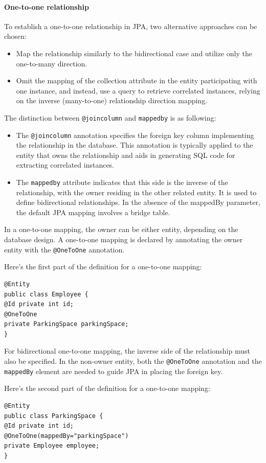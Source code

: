 \paragraph*{One-to-one relationship}
To establish a one-to-one relationship in JPA, two alternative approaches can be chosen:
\begin{itemize}
    \item Map the relationship similarly to the bidirectional case and utilize only the one-to-many direction.
    \item Omit the mapping of the collection attribute in the entity participating with one instance, and instead, use a query to retrieve correlated instances, relying on the inverse (many-to-one) relationship direction mapping.
\end{itemize}
The distinction between \texttt{@joincolumn} and \texttt{mappedby} is as following: 
\begin{itemize}
    \item The \texttt{@joincolumn} annotation specifies the foreign key column implementing the relationship in the database. 
        This annotation is typically applied to the entity that owns the relationship and aids in generating SQL code for extracting correlated instances.
    \item The \texttt{mappedby} attribute indicates that this side is the inverse of the relationship, with the owner residing in the other related entity. 
        It is used to define bidirectional relationships. 
        In the absence of the mappedBy parameter, the default JPA mapping involves a bridge table.
\end{itemize}
In a one-to-one mapping, the owner can be either entity, depending on the database design. 
A one-to-one mapping is declared by annotating the owner entity with the \texttt{@OneToOne} annotation.
\begin{example}
    Here's the first part of the definition for a one-to-one mapping:
    \begin{lstlisting}[style=Java]
@Entity
public class Employee {
@Id private int id;
@OneToOne
private ParkingSpace parkingSpace;
}
    \end{lstlisting}
\end{example}
For bidirectional one-to-one mapping, the inverse side of the relationship must also be specified. 
In the non-owner entity, both the \texttt{@OneToOne} annotation and the \texttt{mappedBy} element are needed to guide JPA in placing the foreign key.
\begin{example}
    Here's the second part of the definition for a one-to-one mapping:
    \begin{lstlisting}[style=Java]
@Entity
public class ParkingSpace {
@Id private int id;
@OneToOne(mappedBy="parkingSpace")
private Employee employee;
}
    \end{lstlisting}
\end{example}

